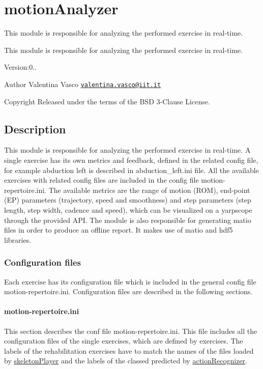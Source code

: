 \section{motion\+Analyzer}
\label{group__motionAnalyzer}


This module is responsible for analyzing the performed exercise in real-\/time.  


This module is responsible for analyzing the performed exercise in real-\/time. 

Version\+:0.. \begin{DoxyAuthor}{Author}
Valentina Vasco \href{mailto:valentina.vasco@iit.it}{\tt valentina.\+vasco@iit.\+it} ~\newline
 
\end{DoxyAuthor}
\begin{DoxyCopyright}{Copyright}
Released under the terms of the B\+SD 3-\/\+Clause License. 
\end{DoxyCopyright}
\hypertarget{group__skeletonViewer_intro_sec}{}\subsection{Description}\label{group__skeletonViewer_intro_sec}
This module is responsible for analyzing the performed exercise in real-\/time. A single exercise has its own metrics and feedback, defined in the related config file, for example abduction left is described in {\ttfamily abduction\+\_\+left.\+ini} file. All the available exercises with related config files are included in the config file {\ttfamily motion-\/repertoire.\+ini}. The available metrics are the range of motion (R\+OM), end-\/point (EP) parameters (trajectory, speed and smoothness) and step parameters (step length, step width, cadence and speed), which can be visualized on a yarpscope through the provided A\+PI. The module is also responsible for generating matio files in order to produce an offline report. It makes use of matio and hdf5 libraries.\hypertarget{group__motionAnalyzer_sec-conf}{}\subsubsection{Configuration files}\label{group__motionAnalyzer_sec-conf}
Each exercise has its configuration file which is included in the general config file motion-\/repertoire.\+ini. Configuration files are described in the following sections.\hypertarget{group__motionAnalyzer_sec-motion-rep}{}\paragraph{motion-\/repertoire.\+ini}\label{group__motionAnalyzer_sec-motion-rep}
This section describes the conf file motion-\/repertoire.\+ini. This file includes all the configuration files of the single exercises, which are defined by {\ttfamily exercises}. The labels of the {\ttfamily rehabilitation} exercises have to match the names of the files loaded by \hyperlink{group__skeletonPlayer}{skeleton\+Player} and the labels of the classed predicted by \hyperlink{group__actionRecognizer}{action\+Recognizer}.

